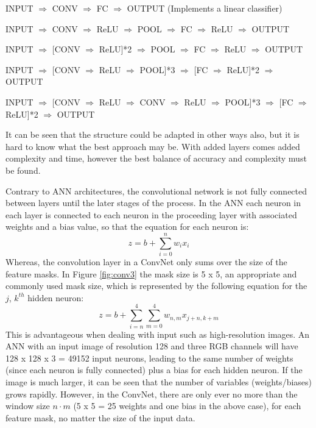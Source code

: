 \documentclass[fleqn,twoside,12pt]{report}
\begin{document}
INPUT $\Rightarrow$ CONV $\Rightarrow$ FC $\Rightarrow$ OUTPUT (Implements a linear classifier)

INPUT $\Rightarrow$ CONV $\Rightarrow$ ReLU $\Rightarrow$ POOL $\Rightarrow$ FC $\Rightarrow$ ReLU $\Rightarrow$ OUTPUT

INPUT $\Rightarrow$ [CONV $\Rightarrow$ ReLU]*2  $\Rightarrow$ POOL $\Rightarrow$ FC $\Rightarrow$ ReLU $\Rightarrow$ OUTPUT

INPUT $\Rightarrow$ [CONV $\Rightarrow$ ReLU $\Rightarrow$ POOL]*3  $\Rightarrow$ [FC $\Rightarrow$ ReLU]*2 $\Rightarrow$ OUTPUT

INPUT $\Rightarrow$ [CONV $\Rightarrow$ ReLU $\Rightarrow$ CONV $\Rightarrow$ ReLU $\Rightarrow$ POOL]*3  $\Rightarrow$ [FC $\Rightarrow$ ReLU]*2 $\Rightarrow$ OUTPUT

It can be seen that the structure could be adapted in other ways also, but it is hard to know what the best approach may be. With added layers comes added complexity and time, however the best balance of accuracy and complexity must be found.


Contrary to ANN architectures, the convolutional network is not fully connected between layers until the later stages of the process. In the ANN each neuron in each layer is connected to each neuron in the proceeding layer with associated weights and a bias value, so that the equation for each neuron is:
\begin{equation}
z = b + \sum_{i=0}^{n} w_i x_i
\end{equation}
Whereas, the convolution layer in a ConvNet only sums over the size of the feature masks. In Figure \ref{fig:conv3} the mask size is 5 x 5, an appropriate and commonly used mask size, which is represented by the following equation for the $j$, $k^{th}$ hidden neuron:
\begin{equation}
z = b + \sum_{i=n}^{4} \sum_{m=0}^{4} w_{n,m}  x_{j+n,k+m}
\end{equation}
This is advantageous when dealing with input such as high-resolution images. An ANN with an input image of resolution 128 and three RGB channels will have 128 x 128 x 3 = 49152 input neurons, leading to the same number of weights (since each neuron is fully connected) plus a bias for each hidden neuron. If the image is much larger, it can be seen that the number of variables (weights/biases) grows rapidly. However, in the ConvNet, there are only ever no more than the window size $n \cdot m$ (5 x 5 = 25 weights and one bias in the above case), for each feature mask, no matter the size of the input data.
\end{document}
